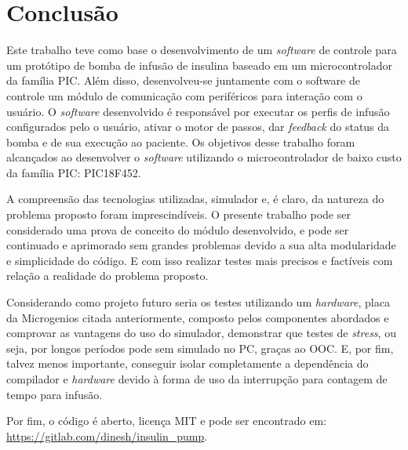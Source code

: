\chapter{Conclusão}
\label{cap:conclusao}
Este trabalho teve como base o desenvolvimento de um \emph{software} de controle para um protótipo de bomba de infusão de insulina baseado em um microcontrolador da família PIC. Além disso, desenvolveu-se juntamente com o software de controle um módulo de comunicação com periféricos para interação com o usuário. O \emph{software} desenvolvido é responsável por executar os perfis de infusão configurados pelo o usuário, ativar o motor de passos, dar \emph{feedback} do status da bomba e de sua execução ao paciente. Os objetivos desse trabalho foram alcançados ao desenvolver o \emph{software} utilizando o microcontrolador de baixo custo da família PIC: PIC18F452. 

A compreensão das tecnologias utilizadas, simulador e, é claro, da natureza do problema proposto foram imprescindíveis. O presente trabalho pode ser considerado uma prova de conceito do módulo desenvolvido, e pode ser continuado e aprimorado sem grandes problemas devido a sua alta modularidade e simplicidade do código. E com isso realizar testes mais precisos e factíveis com relação a realidade do problema proposto. 

Considerando como projeto futuro seria os testes utilizando um \emph{hardware}, placa da Microgenios citada anteriormente, composto pelos componentes abordados e comprovar as vantagens do uso do simulador, demonstrar que testes de \emph{stress}, ou seja, por longos períodos pode sem simulado no PC, graças ao OOC. E, por fim, talvez menos importante, conseguir isolar completamente a dependência do compilador e \emph{hardware} devido à forma de uso da interrupção para contagem de tempo para infusão.

Por fim, o código é aberto, licença MIT e pode ser encontrado em:  \url{https://gitlab.com/dinesh/insulin_pump}.